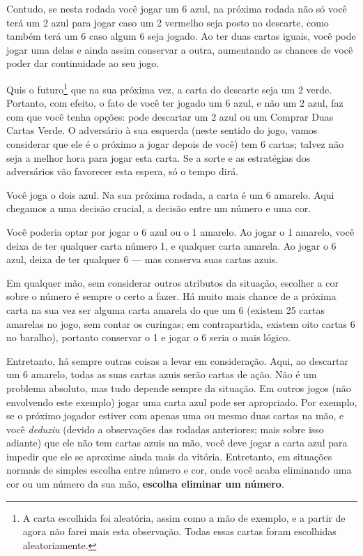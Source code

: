 Contudo, se nesta rodada você jogar um 6 azul, na próxima rodada não só você terá um 2 azul para jogar caso um 2 vermelho seja posto no descarte, como também terá um 6 caso algum 6 seja jogado. Ao ter duas cartas iguais, você pode jogar uma delas e ainda assim conservar a outra, aumentando as chances de você poder dar continuidade ao seu jogo.

Quis o futuro\footnote{A carta escolhida foi aleatória, assim como a mão de exemplo, e a partir de agora não farei mais esta observação. Todas essas cartas foram escolhidas aleatoriamente.} que na sua próxima vez, a carta do descarte seja um 2 verde. Portanto, com efeito, o fato de você ter jogado um 6 azul, e não um 2 azul, faz com que você tenha opções: pode descartar um 2 azul ou um Comprar Duas Cartas Verde. O adversário à sua esquerda (neste sentido do jogo, vamos considerar que ele é o próximo a jogar depois de você) tem 6 cartas; talvez não seja a melhor hora para jogar esta carta. Se a sorte e as estratégias dos adversários vão favorecer esta espera, só o tempo dirá.

Você joga o dois azul. Na sua próxima rodada, a carta é um 6 amarelo. Aqui chegamos a uma decisão crucial, a decisão entre um número e uma cor.

Você poderia optar por jogar o 6 azul ou o 1 amarelo. Ao jogar o 1 amarelo, você deixa de ter qualquer carta número 1, e qualquer carta amarela. Ao jogar o 6 azul, deixa de ter qualquer 6 --- mas conserva suas cartas azuis.

Em qualquer mão, sem considerar outros atributos da situação, escolher a cor sobre o número é sempre o certo a fazer. Há muito mais chance de a próxima carta na sua vez ser alguma carta amarela do que um 6 (existem 25 cartas amarelas no jogo, sem contar os curingas; em contrapartida, existem oito cartas 6 no baralho), portanto conservar o 1 e jogar o 6 seria o mais lógico.

Entretanto, há sempre outras coisas a levar em consideração. Aqui, ao descartar um 6 amarelo, todas as suas cartas azuis serão cartas de ação. Não é um problema absoluto, mas tudo depende sempre da situação. Em outros jogos (não envolvendo este exemplo) jogar uma carta azul pode ser apropriado. Por exemplo, se o próximo jogador estiver com apenas uma ou mesmo duas cartas na mão, e você \textit{deduziu} (devido a observações das rodadas anteriores; mais sobre isso adiante) que ele não tem cartas azuis na mão, você deve jogar a carta azul para impedir que ele se aproxime ainda mais da vitória. Entretanto, em situações normais de simples escolha entre número e cor, onde você acaba eliminando uma cor ou um número da sua mão, \textbf{escolha eliminar um número}.

